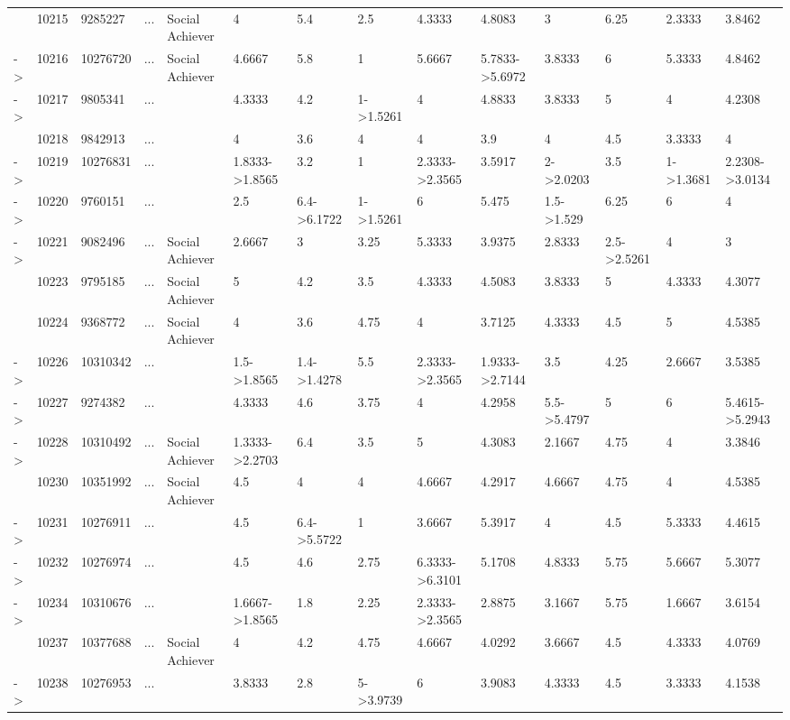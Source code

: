\documentclass[6pt,a4paper]{article}
\begin{document}
\begin{landscape}
{\begin{longtable}{llllllllllllll}
&10215&9285227&...&Social Achiever&4&5.4&2.5&4.3333&4.8083&3&6.25&2.3333&3.8462\tabularnewline
-\textgreater &10216&10276720&...&Social Achiever&4.6667&5.8&1&5.6667&5.7833-\textgreater 5.6972&3.8333&6&5.3333&4.8462\tabularnewline
-\textgreater &10217&9805341&...&&4.3333&4.2&1-\textgreater 1.5261&4&4.8833&3.8333&5&4&4.2308\tabularnewline
&10218&9842913&...&&4&3.6&4&4&3.9&4&4.5&3.3333&4\tabularnewline
-\textgreater &10219&10276831&...&&1.8333-\textgreater 1.8565&3.2&1&2.3333-\textgreater 2.3565&3.5917&2-\textgreater 2.0203&3.5&1-\textgreater 1.3681&2.2308-\textgreater 3.0134\tabularnewline
-\textgreater &10220&9760151&...&&2.5&6.4-\textgreater 6.1722&1-\textgreater 1.5261&6&5.475&1.5-\textgreater 1.529&6.25&6&4\tabularnewline
-\textgreater &10221&9082496&...&Social Achiever&2.6667&3&3.25&5.3333&3.9375&2.8333&2.5-\textgreater 2.5261&4&3\tabularnewline
&10223&9795185&...&Social Achiever&5&4.2&3.5&4.3333&4.5083&3.8333&5&4.3333&4.3077\tabularnewline
&10224&9368772&...&Social Achiever&4&3.6&4.75&4&3.7125&4.3333&4.5&5&4.5385\tabularnewline
-\textgreater &10226&10310342&...&&1.5-\textgreater 1.8565&1.4-\textgreater 1.4278&5.5&2.3333-\textgreater 2.3565&1.9333-\textgreater 2.7144&3.5&4.25&2.6667&3.5385\tabularnewline
-\textgreater &10227&9274382&...&&4.3333&4.6&3.75&4&4.2958&5.5-\textgreater 5.4797&5&6&5.4615-\textgreater 5.2943\tabularnewline
\newpage
-\textgreater &10228&10310492&...&Social Achiever&1.3333-\textgreater 2.2703&6.4&3.5&5&4.3083&2.1667&4.75&4&3.3846\tabularnewline
&10230&10351992&...&Social Achiever&4.5&4&4&4.6667&4.2917&4.6667&4.75&4&4.5385\tabularnewline
-\textgreater &10231&10276911&...&&4.5&6.4-\textgreater 5.5722&1&3.6667&5.3917&4&4.5&5.3333&4.4615\tabularnewline
-\textgreater &10232&10276974&...&&4.5&4.6&2.75&6.3333-\textgreater 6.3101&5.1708&4.8333&5.75&5.6667&5.3077\tabularnewline
-\textgreater &10234&10310676&...&&1.6667-\textgreater 1.8565&1.8&2.25&2.3333-\textgreater 2.3565&2.8875&3.1667&5.75&1.6667&3.6154\tabularnewline
&10237&10377688&...&Social Achiever&4&4.2&4.75&4.6667&4.0292&3.6667&4.5&4.3333&4.0769\tabularnewline
-\textgreater &10238&10276953&...&&3.8333&2.8&5-\textgreater 3.9739&6&3.9083&4.3333&4.5&3.3333&4.1538\tabularnewline
\hline
\end{longtable}}

\end{landscape}
\end{document}
